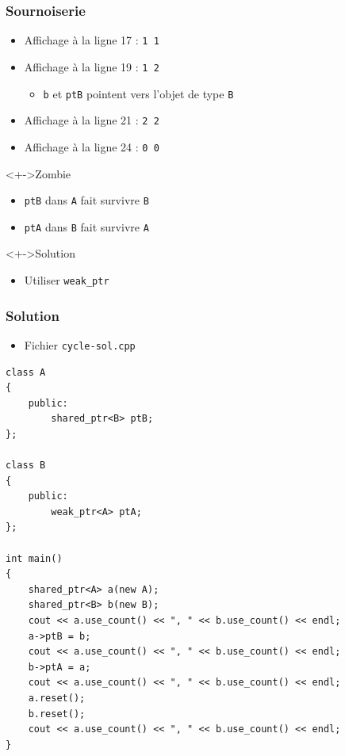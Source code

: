 \begin{frame}
\frametitle{Sournoiserie}
\begin{itemize}[<+->]
\item Affichage à la ligne 17 : \texttt{1 1}
\item Affichage à la ligne 19 : \texttt{1 2}
	\begin{itemize}
	\item \texttt{b} et \texttt{ptB} pointent vers l'objet de type \texttt{B}
	\end{itemize}
\item Affichage à la ligne 21 : \texttt{2 2}
\item Affichage à la ligne 24 : \texttt{0 0}
\end{itemize}
\begin{alertblock}<+->{Zombie}
	\begin{itemize}
	\item \texttt{ptB} dans \texttt{A} fait survivre \texttt{B}
	\item \texttt{ptA} dans \texttt{B} fait survivre \texttt{A}
	\end{itemize}
\end{alertblock}
\begin{block}<+->{Solution}
	\begin{itemize}
	\item Utiliser \texttt{weak\_ptr}
	\end{itemize}
\end{block}
\end{frame}

\begin{frame}[containsverbatim]
\frametitle{Solution}
\begin{itemize}
\item Fichier \texttt{cycle-sol.cpp}
\end{itemize}
\begin{lstlisting}
class A
{
	public:
	    shared_ptr<B> ptB;
};

class B
{
    public:
	    weak_ptr<A> ptA;
};

int main()
{
	shared_ptr<A> a(new A);
	shared_ptr<B> b(new B);
	cout << a.use_count() << ", " << b.use_count() << endl;
	a->ptB = b;
	cout << a.use_count() << ", " << b.use_count() << endl;
	b->ptA = a;
	cout << a.use_count() << ", " << b.use_count() << endl;
	a.reset();
	b.reset();
	cout << a.use_count() << ", " << b.use_count() << endl;
}
\end{lstlisting}
\end{frame}


